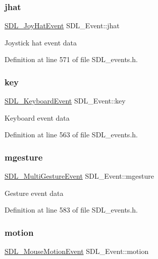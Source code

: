 \subsubsection{\texorpdfstring{jhat}{jhat}}
{\footnotesize\ttfamily \mbox{\hyperlink{struct_s_d_l___joy_hat_event}{S\+D\+L\+\_\+\+Joy\+Hat\+Event}} S\+D\+L\+\_\+\+Event\+::jhat}

Joystick hat event data 

Definition at line 571 of file S\+D\+L\+\_\+events.\+h.

\mbox{\label{union_s_d_l___event_ab99927835cc77a9b6bb50b419b4a27df}} 
\subsubsection{\texorpdfstring{key}{key}}
{\footnotesize\ttfamily \mbox{\hyperlink{struct_s_d_l___keyboard_event}{S\+D\+L\+\_\+\+Keyboard\+Event}} S\+D\+L\+\_\+\+Event\+::key}

Keyboard event data 

Definition at line 563 of file S\+D\+L\+\_\+events.\+h.

\mbox{\label{union_s_d_l___event_ac19b3c6a6b5181a51eb4fbe2cbe726a9}} 
\subsubsection{\texorpdfstring{mgesture}{mgesture}}
{\footnotesize\ttfamily \mbox{\hyperlink{struct_s_d_l___multi_gesture_event}{S\+D\+L\+\_\+\+Multi\+Gesture\+Event}} S\+D\+L\+\_\+\+Event\+::mgesture}

Gesture event data 

Definition at line 583 of file S\+D\+L\+\_\+events.\+h.

\mbox{\label{union_s_d_l___event_ac3c89e190faacbe84280cd539453bab6}} 
\subsubsection{\texorpdfstring{motion}{motion}}
{\footnotesize\ttfamily \mbox{\hyperlink{struct_s_d_l___mouse_motion_event}{S\+D\+L\+\_\+\+Mouse\+Motion\+Event}} S\+D\+L\+\_\+\+Event\+::motion}

